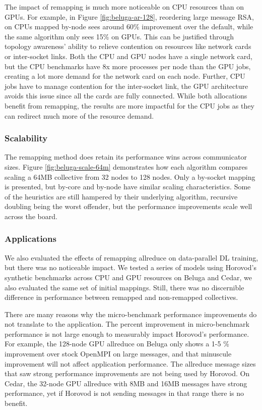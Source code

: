 The impact of remapping is much more noticeable on \gls{CPU} resources than on \gls{GPU}s.
For example, in Figure \ref{fig:beluga-ar-128}, reordering large message \gls{RSA}, on \gls{CPU}s mapped by-node sees around 60\% improvement over the default, while the same algorithm only sees 15\% on \gls{GPU}s.
This can be justified through topology awareness' ability to relieve contention on resources like network cards or inter-socket links. 
Both the \gls{CPU} and \gls{GPU} nodes have a single network card, but the \gls{CPU} benchmarks have 8x more processes per node than the \gls{GPU} jobs, creating a lot more demand for the network card on each node.
Further, \gls{CPU} jobs have to manage contention for the inter-socket link, the \gls{GPU} architecture avoids this issue since all the cards are fully connected.
While both allocations benefit from remapping, the results are more impactful for the \gls{CPU} jobs as they can redirect much more of the resource demand.

\subsubsection{Scalability}



The remapping method does retain its performance wins across communicator sizes. 
Figure \ref{fig:beluga-scale-64m} demonstrates how each algorithm compares scaling a 64MB collective from 32 nodes to 128 nodes.
Only a by-socket mapping is presented, but by-core and by-node have similar scaling characteristics.
Some of the heuristics are still hampered by their underlying algorithm, recursive doubling being the worst offender, but the performance improvements scale well across the board.

\subsubsection{Applications}
We also evaluated the effects of remapping allreduce on data-parallel \gls{DL} training, but there was no noticeable impact.
We tested a series of models using Horovod's synthetic benchmarks across \gls{CPU} and \gls{GPU} resources on Beluga and Cedar, we also evaluated the same set of initial mappings. 
Still, there was no discernible difference in performance between remapped and non-remapped collectives.

There are many reasons why the micro-benchmark performance improvements do not translate to the application.
The percent improvement in micro-benchmark performance is not large enough to measurably impact Horovod's performance.
For example, the 128-node \gls{GPU} allreduce on Beluga only shows a 1-5 \% improvement over stock OpenMPI on large messages, and that minuscule improvement will not affect application performance.
The allreduce message sizes that saw strong performance improvements are not being used by Horovod.
On Cedar, the 32-node \gls{GPU} allreduce with 8MB and 16MB messages have strong performance, yet if Horovod is not sending messages in that range there is no benefit. 

